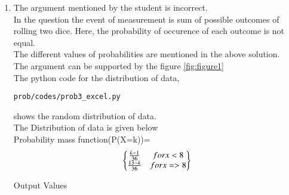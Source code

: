 \begin{enumerate}[label=\arabic*.,ref=\thesubsubsection.\theenumi]
\begin{enumerate}
\end{enumerate}
\begin{enumerate}
\item The argument mentioned by the student is incorrect.
\\
In the question the event of measurement is sum of possible outcomes of rolling two dice.
Here, the probability of occurence of each outcome is not equal. 
\\
The different values of probabilities are mentioned in the above solution.
\\
The argument can be supported by the figure \ref{fig:figure1}
\\ 
The python code for the distribution of data,
\begin{lstlisting}
prob/codes/prob3_excel.py
\end{lstlisting}
shows the random distribution of data.
\\
The Distribution of data is given below
\\
Probability mass function(P(X=k))=
\begin{align}
\begin{Bmatrix}\frac{k-1}{36}& for x<8\\\frac{13-k}{36}& for x=>8\end{Bmatrix}
\end{align}
\begin{table}[ht!]
\centering

\caption{Output Values}
\label{table:table2}	
\end{table}

\end{enumerate}
\end{enumerate}